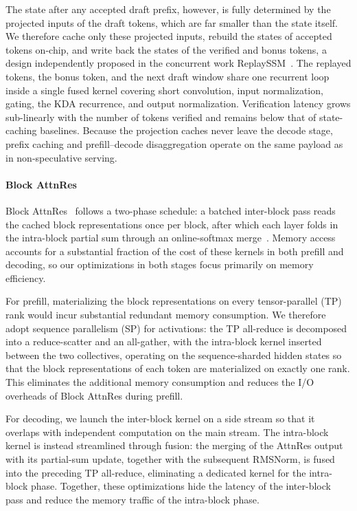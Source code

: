 The state after any accepted draft prefix, however, is fully determined by the projected inputs of the draft tokens, which are far smaller than the state itself.
We therefore cache only these projected inputs, rebuild the states of accepted tokens on-chip, and write back the states of the verified and bonus tokens, a design independently proposed in the concurrent work ReplaySSM~\citep{replayssm2026}.
The replayed tokens, the bonus token, and the next draft window share one recurrent loop inside a single fused kernel covering short convolution, input normalization, gating, the KDA recurrence, and output normalization.
Verification latency grows sub-linearly with the number of tokens verified and remains below that of state-caching baselines.
Because the projection caches never leave the decode stage, prefix caching and prefill--decode disaggregation operate on the same payload as in non-speculative serving.

\paragraph{Block AttnRes}
Block AttnRes~\citep{kimiteam2026attnres} follows a two-phase schedule: a batched inter-block pass reads the cached block representations once per block, after which each layer folds in the intra-block partial sum through an online-softmax merge~\citep{milakov2018online}.
Memory access accounts for a substantial fraction of the cost of these kernels in both prefill and decoding, so our optimizations in both stages focus primarily on memory efficiency.

For prefill, materializing the block representations on every tensor-parallel (TP) rank would incur substantial redundant memory consumption. We therefore adopt sequence parallelism (SP) for activations: the TP all-reduce is decomposed into a reduce-scatter and an all-gather, with the intra-block kernel inserted between the two collectives, operating on the sequence-sharded hidden states so that the block representations of each token are materialized on exactly one rank.
This eliminates the additional memory consumption and reduces the I/O overheads of Block AttnRes during prefill.

For decoding, we launch the inter-block kernel on a side stream so that it overlaps with independent computation on the main stream. The intra-block kernel is instead streamlined through fusion: the merging of the AttnRes output with its partial-sum update, together with the subsequent RMSNorm, is fused into the preceding TP all-reduce, eliminating a dedicated kernel for the intra-block phase.
Together, these optimizations hide the latency of the inter-block pass and reduce the memory traffic of the intra-block phase.


